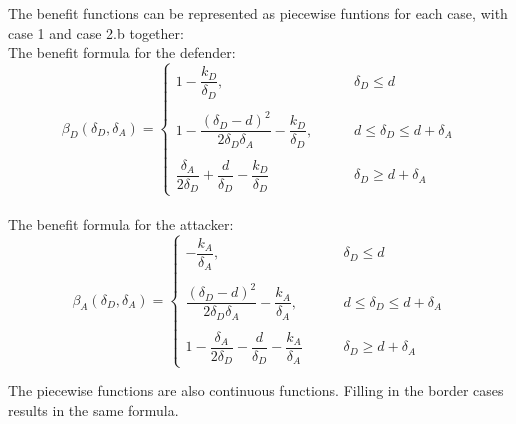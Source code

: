 The benefit functions can be represented as piecewise funtions for each case, with case 1 and case 2.b together:\\
The benefit formula for the defender:
\begin{displaymath}
\beta_{D}(\delta_{D},\delta_{A})= \left\{
\begin{array}{lll}
	1 - \dfrac{k_{D}}{\delta_{D}}, &~~~~~ & \delta_{D} \leq d \\
	~ & ~ \\
   1 - \dfrac{(\delta_{D} - d)^2}{2\delta_{D}\delta_{A}} - \dfrac{k_{D}}{\delta_{D}}, & ~~~~~~& d \leq \delta_{D} \leq d + \delta_{A} \\
   ~ & ~ \\
   \dfrac{\delta_{A}}{2\delta_{D}} + \dfrac{d}{\delta_{D}} - \dfrac{k_{D}}{\delta_{D}} &~~~~~& \delta_{D} \geq d + \delta_{A} 
\end{array}
\right.
\end{displaymath}
~~ \\
The benefit formula for the attacker:
\begin{displaymath}
\beta_{A}(\delta_{D},\delta_{A})= \left\{
\begin{array}{lll}
	 -\dfrac{k_{A}}{\delta_{A}}, & ~~~~~& \delta_{D} \leq d \\
	~ & ~ \\
   \dfrac{(\delta_{D} - d)^2}{2\delta_{D}\delta_{A}} - \dfrac{k_{A}}{\delta_{A}}, & ~~~~~~& d \leq \delta_{D} \leq d + \delta_{A} \\
   ~ & ~ \\
   1 - \dfrac{\delta_{A}}{2\delta_{D}} - \dfrac{d}{\delta_{D}} - \dfrac{k_{A}}{\delta_{A}} &~~~~~& \delta_{D} \geq d + \delta_{A} 

\end{array}
\right.
\end{displaymath}

The piecewise functions are also continuous functions. Filling in the border cases results in the same formula.  

